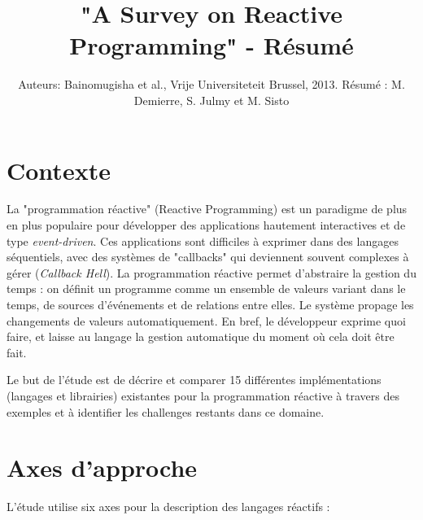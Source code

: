 \documentclass[10pt,final]{IEEEtran}
\begin{document}

\title{"A Survey on Reactive Programming" - Résumé}

\author{Auteurs: Bainomugisha et al., Vrije Universiteteit Brussel, 2013. Résumé : M. Demierre, S. Julmy et M. Sisto\vspace{-4.5ex}}

\maketitle

\section{Contexte}

La "programmation réactive" (Reactive Programming) est un paradigme de plus en plus populaire pour développer des applications hautement interactives et de type \textit{event-driven}. Ces applications sont difficiles à exprimer dans des langages séquentiels, avec des systèmes de "callbacks" qui deviennent souvent complexes à gérer (\textit{Callback Hell}). La programmation réactive  permet d'abstraire la gestion du temps : on définit un programme comme un ensemble de valeurs variant dans le temps, de sources d'événements et de relations entre elles. Le système propage les changements de valeurs automatiquement. En bref, le développeur exprime quoi faire, et laisse au langage la gestion automatique du moment où cela doit être fait.

\vspace{1ex}
Le but de l'étude est de décrire et comparer 15 différentes implémentations (langages et librairies) existantes pour la programmation réactive à travers des exemples et à identifier les challenges restants dans ce domaine.

\section{Axes d'approche}
L'étude utilise six axes pour la description des langages réactifs :
\end{document}
